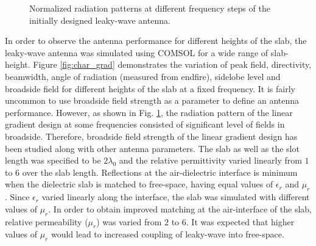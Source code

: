 \begin{figure} [p!]
  \begin{center}
    \hspace*{\fill}%
 
  \hspace*{\fill}%
  
    \hspace*{\fill}%
  
  \hspace*{\fill}%
  
      \hspace*{\fill}%
  
  \hspace*{\fill}%
  
    \hspace*{\fill}%
  
 \hspace*{\fill}%
 
  \hspace*{\fill}%
  
    \hspace*{\fill}%
  
  \hspace*{\fill}%
  
    \hspace*{\fill}%
  
 \end{center}
  \caption{Normalized radiation patterns at different frequency steps of the initially designed leaky-wave antenna.}
\label{fig:inipolar}
\end{figure}
%
In order to observe the antenna performance for different heights of the slab, the leaky-wave antenna was simulated using COMSOL for a wide range of slab-height. Figure \ref{fig:char_grad} demonstrates the variation of peak field, directivity, beamwidth, angle of radiation (measured from endfire), sidelobe level and broadside field for different heights of the slab at a fixed frequency. It is fairly uncommon to use broadside field strength as a parameter to define an antenna performance. However, as shown in Fig. \ref{fig:inipolar}, the radiation pattern of the linear gradient design at some frequencies consisted of significant level of fields in broadside. Therefore, broadside field strength of the linear gradient design has been studied along with other antenna parameters. The slab as well as the slot length was specified to be $2 \lambda_0$ and the relative permittivity varied linearly from $1$ to $6$ over the slab length. Reflections at the air-dielectric interface is minimum when the dielectric slab is matched to free-space, having equal values of $\epsilon_r$ and $\mu_r$. Since $\epsilon_r$ varied linearly along the interface, the slab was simulated with different values of $\mu_r$. In order to obtain improved matching at the air-interface of the slab, relative permeability ($\mu_r$) was varied from $2$ to $6$. It was expected that higher values of $\mu_r$ would lead to increased coupling of leaky-wave into free-space. 

